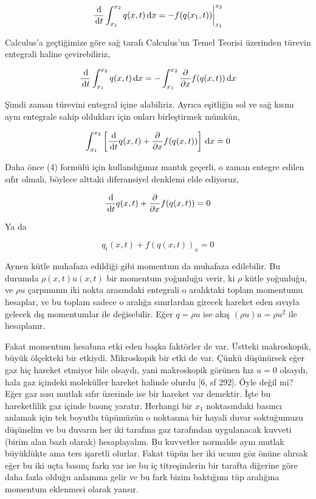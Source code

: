\documentclass[12pt,fleqn]{article}\usepackage{../../common}
\begin{document}
$$
\frac{\,\mathrm{d}}{\,\mathrm{d} t} \int _{x_1}^{x_2} q(x,t) \,\mathrm{d} x =
-f(q(x_1,t)) \biggr\rvert_{x_1}^{x_2}
$$

Calculus'a geçtiğimize göre sağ tarafı Calculus'un Temel Teorisi üzerinden
türevin entegrali haline çevirebiliriz,

$$
\frac{\,\mathrm{d}}{\,\mathrm{d} t} \int _{x_1}^{x_2} q(x,t) \,\mathrm{d} x =
- \int_{x_1}^{x_2} \frac{\partial }{\partial x} f(q(x,t)) \,\mathrm{d} x
$$

Şimdi zaman türevini entegral içine alabiliriz. Ayrıca eşitliğin sol ve sağ
kısmı aynı entegrale sahip oldukları için onları birleştirmek mümkün,

$$
\int _{x_1}^{x_2}
\left[
\frac{\,\mathrm{d}}{\,\mathrm{d} t} q(x,t) + \frac{\partial }{\partial x} f(q(x,t)) 
\right]
\,\mathrm{d} x  = 0
$$

Daha önce (4) formülü için kullandığımız mantık geçerli, o zaman entegre
edilen sıfır olmalı, böylece alttaki diferansiyel denklemi elde ediyoruz,

$$
\frac{\,\mathrm{d}}{\,\mathrm{d} t} q(x,t) + \frac{\partial }{\partial x} f(q(x,t))  = 0
$$

Ya da

$$
q_t(x,t) + f(q(x,t))_x  = 0
$$

Aynen kütle muhafaza edildiği gibi momentum da muhafaza edilebilir. Bu durumda
$\rho(x,t) u(x,t)$ bir momentum yoğunluğu verir, ki $\rho$ kütle yoğunluğu, ve
$\rho u$ çarpımının iki nokta arasındaki entegrali o aralıktaki toplam momentumu
hesaplar, ve bu toplam sadece o aralığa sınırlardan girecek hareket eden sıvıyla
gelecek dış momentumlar ile değisebilir. Eğer $q = \rho u$ ise akış
$(\rho u) u = \rho u^2$ ile hesaplanır.

Fakat momentum hesabına etki eden başka faktörler de var. Üstteki makroskopik,
büyük ölçekteki bir etkiydi. Mikroskopik bir etki de var. Çünkü düşünürsek eğer
gaz hiç hareket etmiyor bile olsaydı, yani makroskopik görünen hız $u=0$
olsaydı, hala gaz içindeki moleküller hareket halinde olurdu [6, sf 292]. Öyle
değil mi?  Eğer gaz ısısı mutlak sıfır üzerinde ise bir hareket var
demektir. İşte bu hareketlilik gaz içinde basınç yaratır. Herhangi bir $x_1$
noktasındaki basıncı anlamak için tek boyutlu tüpümüzün o noktasına bir hayali
duvar soktuğumuzu düşünelim ve bu duvarın her iki tarafına gaz tarafından
uygulanacak kuvveti (birim alan bazlı olarak) hesaplayalım. Bu kuvvetler
normalde aynı mutlak büyüklükte ama ters işaretli olurlar. Fakat tüpün her
iki ucunu göz önüne alırsak eğer bu iki uçta basınç farkı var ise bu
iç titreşimlerin bir tarafta diğerine göre daha fazla olduğu anlamına gelir
ve bu fark bizim baktığımı tüp aralığına momentum eklenmesi olarak yansır.
\end{document}
